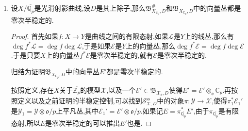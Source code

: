 \begin{enumerate}
\begin{proof}
    	曲线上向量丛$\mathscr{F}$的次数定义为线丛$\bigwedge^r\mathscr{F}$的次数,这里$r=\mathrm{rk}(\mathscr{F})$.
    	
    	\qquad
    	
    	亏格为零的时候代数闭域上的曲线就是射影线,其上的零次线丛只有平凡线丛,于是不妨设$\overline{X}$的亏格$\ge1$.
    	
    	\qquad
    	
    	按照半稳定约化定理,可以找到$\mathbb{Q}_p$的有限扩张$K$,使得$\overline{X}$下降为$K$上的光滑射影曲线$X$,并且$X$存在$K$有理点,并且$X$有在$\mathfrak{o}_K$上的半稳定模型$\mathcal{X}$.于是$\mathcal{X}/\mathfrak{o}_K$是零维上同调平坦的【】.于是$\mathrm{Pic}^0_{\mathcal{X}.\mathfrak{o}_K}$是$\mathfrak{o}_K$上的半阿贝尔概形(这件事对局部有限表示的半稳定曲线总成立【】 ).于是【】$\mathrm{Pic}^0_{\mathcal{X}/\mathfrak{o}_K}$是$\mathrm{Pic}^0_{X/K}(\mathbb{C}_p)=\mathrm{Pic}^0(X_{\mathbb{C}_p})$的开子群,后者恰好由零次线丛(的等价类)构成.
    	
    	\qquad
    	
    	断言:如果$L\in\mathrm{Pic}^0(X_{\mathbb{C}_p})$落在开子群$\mathrm{Pic}^0_{\mathcal{X}/\mathfrak{o}_K}$中,那么$L\in\mathfrak{B}_{X_{\mathbb{C}_p}}$.
    	
    	\qquad
    	
    	
    	
    	
    	因为在$\mathcal{X}$光滑的时候【】
    	
    	
    	
    	
    \end{proof}
    \item 设$X/\overline{\mathbb{Q}_p}$是光滑射影曲线,设$D$是其上除子,那么$\mathfrak{B}_{X_{\mathbb{C}_p},D}^{\#}$和$\mathfrak{B}_{X_{\mathbb{C}_p},D}$中的向量丛都是零次半稳定的.
    \begin{proof}
    	
    	首先如果$f:X\to Y$是曲线之间的有限态射,如果$\mathscr{L}$是$Y$上的线丛,那么有$\deg f^*\mathscr{L}=\deg f\deg\mathscr{L}$,于是如果$\mathcal{E}$是$Y$上的向量丛,那么$\deg f^*\mathcal{E}=\deg f\deg\mathcal{E}$.于是只要$X$上的向量丛$f^*\mathcal{E}$是零次半稳定的,就有$\mathcal{E}$是零次半稳定的.
    	
    	\qquad
    	
    	归结为证明$\mathfrak{B}_{X_{\mathbb{C}_p},D}$中的向量丛$E'$都是零次半稳定的.
    	
    	\qquad
    	
    	按照定义,存在$X$关于$\overline{\mathbb{Z}_p}$的模型$\mathcal{X}$,以及一个$\mathcal{E}'\in\mathfrak{B}_{\mathcal{X}_{\mathfrak{o}},D}$使得$E'=\mathcal{E}'\otimes_{\mathfrak{o}}\mathbb{C}_p$.再按照定义以及之前证明的半稳定控制,可以找到$\mathscr{S}^{\mathrm{ss}}_{\mathcal{X},D}$中的对象$\pi:\mathcal{Y}\to\mathcal{X}$,使得$\pi_1^*\mathcal{E}_1'$是$\mathcal{Y}_1=\mathcal{Y}\otimes\mathfrak{o}/p$上平凡丛,其中$\mathcal{E}_1'=\mathcal{E}'\otimes\mathfrak{o}/p$.如果记$E=\pi^*_{\overline{\mathbb{Q}_p}}E'$,由于$\pi_{\overline{\mathbb{Q}_p}}$是有限态射,所以$E$是零次半稳定的可以推出$E'$也是.
    	

\end{proof}
\end{enumerate}
